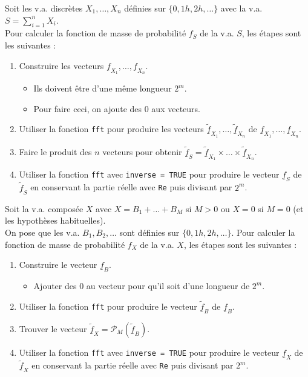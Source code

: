 \documentclass[10pt, french]{article}
\begin{document}
\begin{multicols*}{2}
\begin{algo2}
Soit les v.a. discrètes $X_{1}, \dots, X_{n}$ définies sur $\{0, 1h, 2h, \dots\}$ avec la v.a. $S	=	\sum_{i = 1}^{n} X_{i}$.\\
Pour calculer la fonction de masse de probabilité $f_{S}$ de la v.a. $S$, les étapes sont les suivantes :
\begin{enumerate}
	\item	Construire les vecteurs $\underline{f}_{X_{1}}, \dots, \underline{f}_{X_{n}}$.
		\begin{itemize}
		\item	Ils doivent être d'une même longueur $2^{m}$.
		\item	Pour faire ceci, on ajoute des 0 aux vecteurs.
		\end{itemize}
	\item	Utiliser la fonction \texttt{fft} pour produire les vecteurs $\underline{\widetilde{f}}_{X_{1}}, \dots, \underline{\widetilde{f}}_{X_{n}}$ de $\underline{f}_{X_{1}}, \dots, \underline{f}_{X_{n}}$.
	\item	Faire le produit des $n$ vecteurs pour obtenir $\underline{\widetilde{f}}_{S}	=	\underline{\widetilde{f}}_{X_{1}} \times \dots \times \underline{\widetilde{f}}_{X_{n}}$.	
	\item	Utiliser la fonction \texttt{fft} avec \texttt{inverse = TRUE} pour produire le vecteur $\underline{f}_{S}$ de $\underline{\widetilde{f}}_{S}$ en conservant la partie réelle avec \texttt{Re} puis divisant par $2^{m}$.
\end{enumerate}
\end{algo2}

\begin{algo2}
Soit la v.a. composée $X$ avec $X	=	B_{1}	+	\dots	+	B_{M}$ si $M	> 0$ ou $X = 0$ si $M	=	0$ (et les hypothèses habituelles). \\
On pose que les v.a. $B_{1}, B_{2}, \dots$ sont définies sur $\{0, 1h, 2h, \dots\}$.
Pour calculer la fonction de masse de probabilité $f_{X}$ de la v.a. $X$, les étapes sont les suivantes :
\begin{enumerate}
	\item	Construire le vecteur $\underline{f}_{B}$.
		\begin{itemize}
		\item	Ajouter des 0 au vecteur pour qu'il soit d'une longueur de $2^{m}$.
		\end{itemize}
	\item	Utiliser la fonction \texttt{fft} pour produire le vecteur $\underline{\widetilde{f}}_{B}$ de $\underline{f}_{B}$.
	\item	Trouver le vecteur $\underline{\widetilde{f}}_{X}	=	\mathcal{P}_{M}(\underline{\widetilde{f}}_{B})$.
	\item	Utiliser la fonction \texttt{fft} avec \texttt{inverse = TRUE} pour produire le vecteur $\underline{f}_{X}$ de $\underline{\widetilde{f}}_{X}$ en conservant la partie réelle avec \texttt{Re} puis divisant par $2^{m}$.
\end{enumerate}
\end{algo2}



\end{multicols*}
\end{document}
